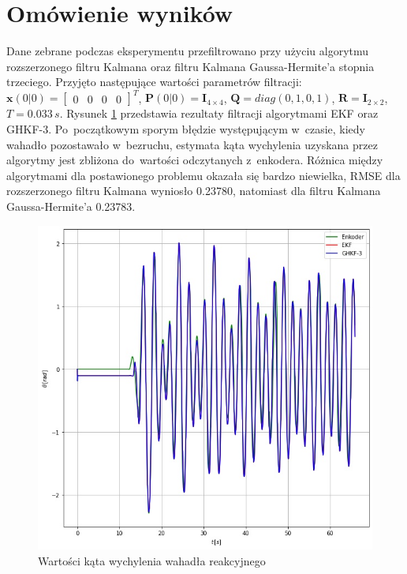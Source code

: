 \section{Omówienie wyników}
\label{sec:pendulum_results}
Dane zebrane podczas eksperymentu przefiltrowano przy użyciu algorytmu rozszerzonego filtru Kalmana oraz filtru Kalmana Gaussa-Hermite'a stopnia trzeciego. Przyjęto następujące wartości parametrów filtracji: $\boldsymbol{x}(0|0) = \begin{bmatrix}
0 & 0 & 0 & 0
\end{bmatrix}^T$, $\boldsymbol{P}(0|0)=\boldsymbol{I}_{4\times4}$, $\boldsymbol{Q} = diag(0, 1, 0, 1)$, $\boldsymbol{R}=\boldsymbol{I}_{2\times2}$, $T=0.033\,s$. Rysunek \ref{fig:pendulum_results} przedstawia rezultaty filtracji algorytmami EKF oraz GHKF-3. Po~początkowym sporym błędzie występującym w~czasie, kiedy wahadło pozostawało w~bezruchu, estymata kąta wychylenia uzyskana przez algorytmy jest zbliżona do~wartości odczytanych z~enkodera. Różnica między algorytmami dla postawionego problemu okazała się bardzo niewielka, RMSE dla rozszerzonego filtru Kalmana wyniosło 0.23780, natomiast dla filtru Kalmana Gaussa-Hermite'a 0.23783. 
\begin{figure}
	\centering
	\includegraphics[width=0.8\linewidth]{pendulum_results.jpg}
	\caption{Wartości kąta wychylenia wahadła reakcyjnego}
	\label{fig:pendulum_results}
\end{figure}
